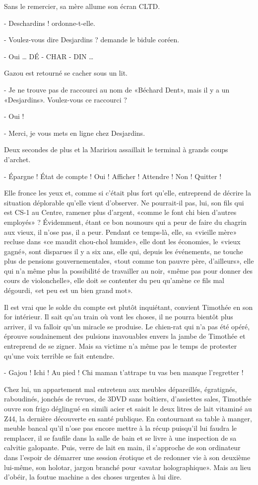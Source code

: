 Sans le remercier, sa mère allume son écran CLTD.

- Deschardins ! ordonne-t-elle.

- Voulez-vous dire Desjardins ? demande le bidule coréen.

- Oui … DÉ - CHAR - DIN …

Gazou est retourné se cacher sous un lit.

- Je ne trouve pas de raccourci au nom de «Béchard Dent», mais il y a un «Desjardins». Voulez-vous ce raccourci ?

- Oui !

- Merci, je vous mets en ligne chez Desjardins.

Deux secondes de plus et la Maririou assaillait le terminal à grands coups d’archet.

- Épargne ! État de compte ! Oui ! Afficher ! Attendre ! Non ! Quitter !

Elle fronce les yeux et, comme si c’était plus fort qu’elle, entreprend de décrire la situation déplorable qu’elle vient d’observer. Ne pourrait-il pas, lui, son fils qui est CS-1 au Centre, ramener plus d’argent, «comme le font chi bien d’autres employés» ? Évidemment, étant ce bon nounours qui a peur de faire du chagrin aux vieux, il n’ose pas, il a peur. Pendant ce temps-là, elle, sa «vieille mère» recluse dans «ce maudit chou-chol humide», elle dont les économies, le «vieux gagné», sont disparues il y a six ans, elle qui, depuis les événements, ne touche plus de pensions gouvernementales, «tout comme ton pauvre père, d’ailleurs», elle qui n’a même plus la possibilité de travailler au noir, «même pas pour donner des cours de violonchelle», elle doit se contenter du peu qu’amène ce fils mal dégourdi, «et peu est un bien grand mot».

Il est vrai que le solde du compte est plutôt inquiétant, convient Timothée en son for intérieur. Il sait qu’au train où vont les choses, il ne pourra bientôt plus arriver, il va falloir qu’un miracle se produise.
Le chien-rat qui n’a pas été opéré, éprouve soudainement des pulsions inavouables envers la jambe de Timothée et entreprend de se zigner. Mais sa victime n’a même pas le temps de protester qu’une voix terrible se fait entendre.

- Gajou ! Ichi ! Au pied ! Chi maman t’attrape tu vas ben manque l’regretter !

Chez lui, un appartement mal entretenu aux meubles dépareillés, égratignés, raboudinés, jonchés de revues, de 3DVD sans boîtiers, d’assiettes sales, Timothée ouvre son frigo déglingué en simili acier et saisit le deux litres de lait vitaminé au Z44, la dernière découverte en santé publique. En contournant sa table à manger, meuble bancal qu’il n’ose pas encore mettre à la récup puisqu’il lui faudra le remplacer, il se faufile dans la salle de bain et se livre à une inspection de sa calvitie galopante. Puis, verre de lait en main, il s’approche de son ordinateur dans l’espoir de démarrer une session érotique et de redonner vie à son deuxième lui-même, son holotar, jargon branché pour «avatar holographique». Mais au lieu d’obéir, la foutue machine a des choses urgentes à lui dire.

